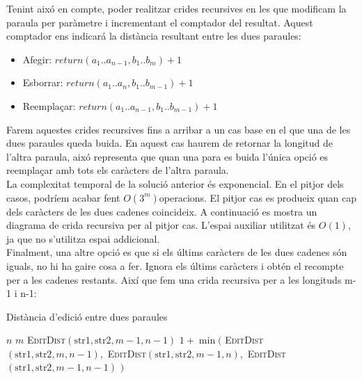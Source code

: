 \documentclass[conference]{IEEEtran}
\begin{document}
    Tenint aixó en compte, poder realitzar crides recursives en les que modificam la paraula per paràmetre i incrementant el comptador del resultat. Aquest comptador ens indicará la distància resultant entre les dues paraules:
    \begin{itemize}
        \item Afegir: $return  (a_1..a_{n-1}, b_1..b_m) + 1$
        \item Esborrar: $return (a_1..a_n, b_1..b_{m-1}) + 1$
        \item Reemplaçar: $return (a_1..a_{n-1}, b_1..b_{m-1}) + 1$
    \end{itemize}
    Farem aquestes crides recursives fins a arribar a un cas base en el que una de les dues paraules queda buida. En aquest cas haurem de retornar la longitud de l'altra paraula, aixó representa que quan una para es buida l'única opció es reemplaçar amb tots els caràcters de l'altra paraula.\\
    La complexitat temporal de la solució anterior és exponencial. En el pitjor dels casos, podríem acabar fent $O(3^m)$operacions. El pitjor cas es produeix quan cap dels caràcters de les dues cadenes coincideix. A continuació es mostra un diagrama de crida recursiva per al pitjor cas.
    L'espai auxiliar utilitzat és $O(1)$, ja que no s'utilitza espai addicional.\\
    Finalment, una altre opció es que si els últims caràcters de les dues cadenes són iguals, no hi ha gaire cosa a fer. Ignora els últims caràcters i obtén el recompte per a les cadenes restants. Així que fem una crida recursiva per a les longituds m-1 i n-1:
    \begin{algorithm}
        \caption{Distància d'edició entre dues paraules}
    
    \begin{algorithmic}
            \State \Return $n$
        \EndIf
            \State \Return $m$
        \EndIf
            \State \Return \textsc{EditDist}$(\textrm{str1}, \textrm{str2}, m - 1, n - 1)$
        \EndIf
        \State \Return $1 + \min($
        \State \hspace{2em} \textsc{EditDist}$(\textrm{str1}, \textrm{str2}, m, n - 1),$ 
        \State \hspace{2em} \textsc{EditDist}$(\textrm{str1}, \textrm{str2}, m - 1, n),$ 
        \State \hspace{2em} \textsc{EditDist}$(\textrm{str1}, \textrm{str2}, m - 1, n - 1)$ 
        \State $)$
        \EndFunction
    \end{algorithmic}
\end{algorithm}
\end{document}

